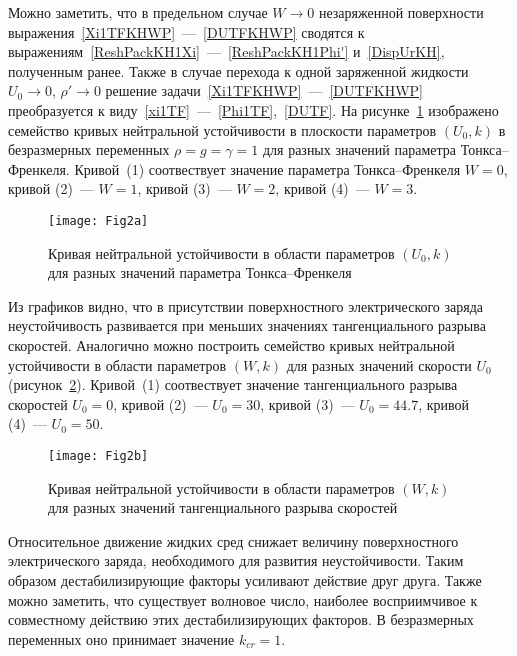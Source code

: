 Можно заметить, что в предельном случае  $ W \rightarrow 0 $ незаряженной поверхности выражения~\eqref{Xi1TFKHWP}~---~\eqref{DUTFKHWP}  сводятся к выражениям~\eqref{ReshPackKH1Xi}~---~\eqref{ReshPackKH1Phi'} и~\eqref{DispUrKH}, полученным ранее. Также в случае перехода к одной заряженной жидкости  $ U_{0}\rightarrow 0 $, $ \rho' \rightarrow 0 $  решение задачи~\eqref{Xi1TFKHWP}~---~\eqref{DUTFKHWP}   преобразуется к виду~\eqref{xi1TF}~---~\eqref{Phi1TF},~\eqref{DUTF}. На рисунке~\ref{fig:KHWNeutralU} изображено семейство кривых нейтральной устойчивости в плоскости параметров $ \left( U_{0}, k \right) $  в безразмерных переменных  $ \rho=g=\gamma=1 $ для разных значений параметра Тонкса--Френкеля. Кривой~(1) соотвествует значение параметра Тонкса--Френкеля $ W=0 $, кривой (2)~--- $ W=1 $, кривой (3)~--- $ W=2 $, кривой (4)~--- $ W=3 $.
\begin{figure}[ht]
\centering
\texttt{[image: Fig2a]}
\caption{Кривая нейтральной устойчивости в области параметров $ \left( U_{0}, k \right) $ для разных значений параметра Тонкса--Френкеля}\label{fig:KHWNeutralU}
\end{figure}
Из графиков видно, что в присутствии поверхностного электрического заряда неустойчивость развивается при меньших значениях тангенциального разрыва скоростей. Аналогично можно построить семейство кривых нейтральной устойчивости в области параметров  $ \left( W, k \right) $ для разных значений скорости  $ U_{0} $ (рисунок~\ref{fig:KHWNeutralW}). Кривой~(1) соотвествует значение тангенциального разрыва скоростей $ U_{0}=0 $, кривой (2)~--- $ U_{0}=30 $, кривой (3)~--- $ U_{0}=44.7 $, кривой (4)~--- $ U_{0}=50 $.
\begin{figure}[ht]
\centering
\texttt{[image: Fig2b]}
\caption{Кривая нейтральной устойчивости в области параметров $ \left( W, k \right) $ для разных значений тангенциального разрыва скоростей}\label{fig:KHWNeutralW}
\end{figure}
Относительное движение жидких сред снижает величину поверхностного электрического заряда, необходимого для развития неустойчивости. Таким образом дестабилизирующие факторы усиливают действие друг друга. Также можно заметить, что существует волновое число, наиболее восприимчивое к совместному действию этих дестабилизирующих факторов. В безразмерных переменных оно принимает значение  $ k_{cr}=1 $.


